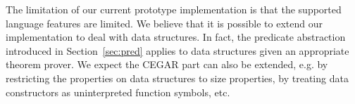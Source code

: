 The limitation of our current prototype implementation is that the 
supported language features are limited. We believe that it is possible 
to extend our implementation to deal with data structures. In fact, the 
predicate abstraction introduced in Section~\ref{sec:pred} applies to 
data structures 
given an appropriate theorem prover. We expect the CEGAR part can also 
be extended, e.g. by restricting the properties on data structures to 
size properties, by treating data constructors as uninterpreted function 
symbols, etc.

